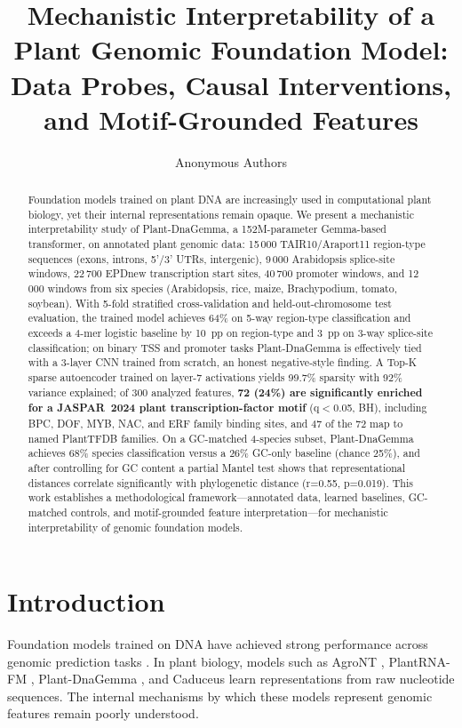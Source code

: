 \documentclass{article}
\title{Mechanistic Interpretability of a Plant Genomic Foundation Model:\\
       Data Probes, Causal Interventions, and Motif-Grounded Features}
\author{%
  Anonymous Authors \\
}
\begin{document}
\maketitle

\begin{abstract}
Foundation models trained on plant DNA are increasingly used in computational
plant biology, yet their internal representations remain opaque. We present a
mechanistic interpretability study of Plant-DnaGemma, a 152M-parameter
Gemma-based transformer, on annotated plant genomic data: 15\,000
TAIR10/Araport11 region-type sequences (exons, introns, 5'/3' UTRs,
intergenic), 9\,000 Arabidopsis splice-site windows, 22\,700 EPDnew
transcription start sites, 40\,700 promoter windows, and 12\,000 windows from
six species (Arabidopsis, rice, maize, Brachypodium, tomato, soybean). With
5-fold stratified cross-validation and held-out-chromosome test evaluation,
the trained model achieves 64\% on 5-way region-type classification and
exceeds a 4-mer logistic baseline by 10~pp on region-type and 3~pp on
3-way splice-site classification; on binary TSS and promoter tasks
Plant-DnaGemma is effectively tied with a 3-layer CNN trained from scratch,
an honest negative-style finding. A Top-K sparse autoencoder trained on
layer-7 activations yields 99.7\% sparsity with 92\% variance explained;
of 300 analyzed features, \textbf{72 (24\%) are significantly enriched for a
JASPAR~2024 plant transcription-factor motif} (q$<$0.05, BH), including BPC,
DOF, MYB, NAC, and ERF family binding sites, and 47 of the 72 map to named
PlantTFDB families. On a GC-matched 4-species subset, Plant-DnaGemma
achieves 68\% species classification versus a 26\% GC-only baseline (chance
25\%), and after controlling for GC content a partial Mantel test shows that
representational distances correlate significantly with phylogenetic
distance (r=0.55, p=0.019). This work establishes a methodological
framework---annotated data, learned baselines, GC-matched controls, and
motif-grounded feature interpretation---for mechanistic interpretability of
genomic foundation models.
\end{abstract}

\section{Introduction}

Foundation models trained on DNA have achieved strong performance across
genomic prediction tasks \citep{dalla2023nucleotide, nguyen2024hyenadna,
ji2021dnabert, zhou2023dnabert2}. In plant biology, models such as AgroNT
\citep{mendoza2024agront}, PlantRNA-FM \citep{yu2024plantrna}, Plant-DnaGemma
\citep{zhang2024plantdnagemma}, and Caduceus \citep{schiff2024caduceus} learn
representations from raw nucleotide sequences. The internal mechanisms by
which these models represent genomic features remain poorly understood.
\end{document}
